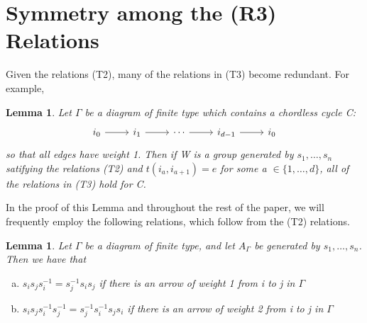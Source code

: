 \documentclass[11pt]{amsart}
\newtheorem{lem}[thm]{Lemma}
\theoremstyle{definition}
\begin{document}
\section{Symmetry among the (R3) Relations}
\label{sec:one_relation}

Given the relations (T2), many of the relations in (T3) become redundant. For example,

\begin{lem} \label{Sym-Lem}
Let $\Gamma$ be a diagram of finite type which contains a chordless cycle C:
\begin{equation*}
\begin{tikzcd}
i_0 \arrow{r} & i_1 \arrow{r} & \cdots \arrow{r} & i_{d-1} \arrow{r} & i_0
\end{tikzcd}
\end{equation*}
so that all edges have weight 1. Then if W is a group generated by $s_{1}, \dots, s_{n}$ satifying the relations (T2) and $t(i_{a}, i_{a+1}) = e$ for some a $\in \{1, \dots, d\}$, all of the relations in (T3) hold for C.
\end{lem}

In the proof of this Lemma and throughout the rest of the paper, we will frequently employ the following relations, which follow from the (T2) relations.

\begin{lem} \label{Extra-Rel}
Let $\Gamma$ be a diagram of finite type, and let $A_{\Gamma}$ be generated by $s_{1}, \dots, s_{n}$. Then we have that 
\begin{enumerate}[(a)]
\item $s_{i}s_{j}s_{i}^{-1} = s_{j}^{-1}s_{i}s_{j}$ if there is an arrow of weight 1 from i to j in $\Gamma$ \\
\item $s_{i}s_{j}s_{i}^{-1}s_{j}^{-1} = s_{j}^{-1}s_{i}^{-1}s_{j}s_{i}$ if there is an arrow of weight 2 from i to j in $\Gamma$
\end{enumerate}
\end{lem}
\end{document}
